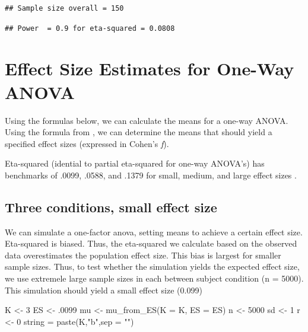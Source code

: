 \documentclass[
]{book}
\newenvironment{Shaded}{\begin{snugshade}}{\end{snugshade}}
\newcommand{\AttributeTok}[1]{\textcolor[rgb]{0.77,0.63,0.00}{#1}}
\newcommand{\CommentTok}[1]{\textcolor[rgb]{0.56,0.35,0.01}{\textit{#1}}}
\newcommand{\DecValTok}[1]{\textcolor[rgb]{0.00,0.00,0.81}{#1}}
\newcommand{\FunctionTok}[1]{\textcolor[rgb]{0.00,0.00,0.00}{#1}}
\newcommand{\NormalTok}[1]{#1}
\newcommand{\OtherTok}[1]{\textcolor[rgb]{0.56,0.35,0.01}{#1}}
\newcommand{\StringTok}[1]{\textcolor[rgb]{0.31,0.60,0.02}{#1}}
\begin{document}
\begin{verbatim}
## Sample size overall = 150
\end{verbatim}

\begin{verbatim}
## Power  = 0.9 for eta-squared = 0.0808
\end{verbatim}

\begin{Shaded}
\end{Shaded}

\newpage

\hypertarget{effect-size-estimates-for-one-way-anova}{%
\section{Effect Size Estimates for One-Way ANOVA}\label{effect-size-estimates-for-one-way-anova}}

Using the formulas below, we can calculate the means for a one-way ANOVA. Using the formula from \citet{albers2018power}, we can determine the means that should yield a specified effect sizes (expressed in Cohen's \emph{f}).

Eta-squared (idential to partial eta-squared for one-way ANOVA's) has benchmarks of .0099, .0588, and .1379 for small, medium, and large effect sizes \citep{cohen1988spa}.

\hypertarget{three-conditions-small-effect-size}{%
\subsection{Three conditions, small effect size}\label{three-conditions-small-effect-size}}

We can simulate a one-factor anova, setting means to achieve a certain effect size. Eta-squared is biased. Thus, the eta-squared we calculate based on the observed data overestimates the population effect size. This bias is largest for smaller sample sizes. Thus, to test whether the simulation yields the expected effect size, we use extremele large sample sizes in each between subject condition (n = 5000). This simulation should yield a small effect size (0.099)

\begin{Shaded}
\begin{Highlighting}[]
\NormalTok{K }\OtherTok{\textless{}{-}} \DecValTok{3}
\NormalTok{ES }\OtherTok{\textless{}{-}}\NormalTok{ .}\DecValTok{0099}
\NormalTok{mu }\OtherTok{\textless{}{-}} \FunctionTok{mu\_from\_ES}\NormalTok{(}\AttributeTok{K =}\NormalTok{ K, }\AttributeTok{ES =}\NormalTok{ ES)}
\NormalTok{n }\OtherTok{\textless{}{-}} \DecValTok{5000}
\NormalTok{sd }\OtherTok{\textless{}{-}} \DecValTok{1}
\NormalTok{r }\OtherTok{\textless{}{-}} \DecValTok{0}
\NormalTok{string }\OtherTok{=} \FunctionTok{paste}\NormalTok{(K,}\StringTok{"b"}\NormalTok{,}\AttributeTok{sep =} \StringTok{""}\NormalTok{)}
\end{Highlighting}
\end{Shaded}
\end{document}
